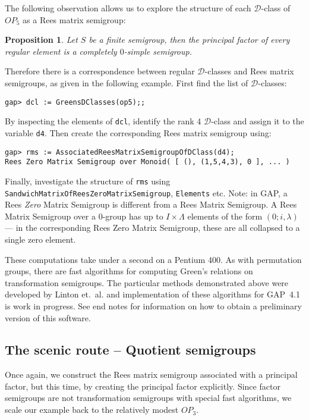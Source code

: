 \documentclass[12pt]{article}
\theoremstyle{plain} \newtheorem{Thm}{Theorem}
\theoremstyle{plain} \newtheorem{Cor}{Corollary}
\theoremstyle{plain} \newtheorem{Lemma}{Lemma}
\theoremstyle{plain} \newtheorem{Prop}{Proposition}
\theoremstyle{plain} \newtheorem{Ex}{Exercise}
\def\gap{\sf GAP}
\def\d{${\mathcal{D}}$}
\begin{document}
The following observation allows us to explore the structure of 
each \d-class of $OP_5$ as a Rees matrix semigroup:
\begin{Prop}\label{regfact}
Let $S$ be a finite semigroup, then the principal factor 
of every regular element is a completely $0$-simple semigroup.
\end{Prop}
Therefore there is a correspondence between regular 
\d-classes and Rees matrix semigroups, as given in the following
example. First find the list of \d-classes:
\begin{verbatim}
gap> dcl := GreensDClasses(op5);;
\end{verbatim}
By inspecting the elements of {\tt dcl}, identify the
rank 4 \d-class and assign it to the variable {\tt d4}. 
Then create the corresponding Rees matrix semigroup using:
\begin{verbatim}
gap> rms := AssociatedReesMatrixSemigroupOfDClass(d4);
Rees Zero Matrix Semigroup over Monoid( [ (), (1,5,4,3), 0 ], ... )
\end{verbatim}
Finally, investigate the structure of {\tt rms} using 
{\tt SandwichMatrixOfReesZeroMatrixSemigroup}, {\tt Elements} etc.
Note: in {\gap}, a Rees {\it Zero} Matrix Semigroup  is different from 
a Rees Matrix Semigroup. A Rees Matrix Semigroup over a $0$-group 
has up to $I \times \Lambda$ elements of the form $(0; i, \lambda)$ --- in the 
corresponding Rees Zero Matrix Semigroup, these are all collapsed to a 
single zero element.


These computations take under a second on a Pentium 400. 
As with permutation groups, there are fast algorithms for
computing Green's relations on transformation semigroups.
The particular methods demonstrated above were developed  
by Linton et.~al.  \cite{linton_tsemi} and implementation
of these algorithms for {\gap}~4.1 is work in progress.
See end notes for information on how to obtain a preliminary
version of this software.
 

\subsection{The scenic route -- Quotient semigroups}
Once again, we construct the 
Rees matrix semigroup associated with a principal factor, but
this time, by creating the principal factor explicitly. Since 
factor semigroups are not transformation semigroups with
special fast algorithms, we scale our example back to the 
relatively modest $OP_3$. 
\end{document}
